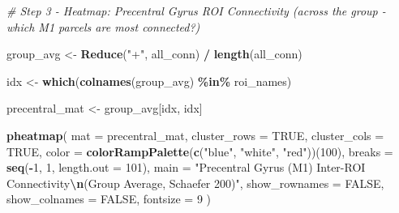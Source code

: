\documentclass[
]{article}
\newenvironment{Shaded}{\begin{snugshade}}{\end{snugshade}}
\newcommand{\AttributeTok}[1]{\textcolor[rgb]{0.13,0.29,0.53}{#1}}
\newcommand{\CommentTok}[1]{\textcolor[rgb]{0.56,0.35,0.01}{\textit{#1}}}
\newcommand{\ConstantTok}[1]{\textcolor[rgb]{0.56,0.35,0.01}{#1}}
\newcommand{\DecValTok}[1]{\textcolor[rgb]{0.00,0.00,0.81}{#1}}
\newcommand{\FunctionTok}[1]{\textcolor[rgb]{0.13,0.29,0.53}{\textbf{#1}}}
\newcommand{\NormalTok}[1]{#1}
\newcommand{\OtherTok}[1]{\textcolor[rgb]{0.56,0.35,0.01}{#1}}
\newcommand{\SpecialCharTok}[1]{\textcolor[rgb]{0.81,0.36,0.00}{\textbf{#1}}}
\newcommand{\StringTok}[1]{\textcolor[rgb]{0.31,0.60,0.02}{#1}}
\begin{document}
\begin{Shaded}
\begin{Highlighting}[]
\CommentTok{\# Step 3 {-} Heatmap: Precentral Gyrus ROI Connectivity (across the group {-} which M1 parcels are most connected?)}

\NormalTok{group\_avg }\OtherTok{\textless{}{-}} \FunctionTok{Reduce}\NormalTok{(}\StringTok{"+"}\NormalTok{, all\_conn) }\SpecialCharTok{/} \FunctionTok{length}\NormalTok{(all\_conn)}

\NormalTok{idx }\OtherTok{\textless{}{-}} \FunctionTok{which}\NormalTok{(}\FunctionTok{colnames}\NormalTok{(group\_avg) }\SpecialCharTok{\%in\%}\NormalTok{ roi\_names)}

\NormalTok{precentral\_mat }\OtherTok{\textless{}{-}}\NormalTok{ group\_avg[idx, idx]}

\FunctionTok{pheatmap}\NormalTok{(}
  \AttributeTok{mat           =}\NormalTok{ precentral\_mat,}
  \AttributeTok{cluster\_rows  =} \ConstantTok{TRUE}\NormalTok{,}
  \AttributeTok{cluster\_cols  =} \ConstantTok{TRUE}\NormalTok{,}
  \AttributeTok{color         =} \FunctionTok{colorRampPalette}\NormalTok{(}\FunctionTok{c}\NormalTok{(}\StringTok{"blue"}\NormalTok{, }\StringTok{"white"}\NormalTok{, }\StringTok{"red"}\NormalTok{))(}\DecValTok{100}\NormalTok{),}
  \AttributeTok{breaks        =} \FunctionTok{seq}\NormalTok{(}\SpecialCharTok{{-}}\DecValTok{1}\NormalTok{, }\DecValTok{1}\NormalTok{, }\AttributeTok{length.out =} \DecValTok{101}\NormalTok{),}
  \AttributeTok{main          =} \StringTok{"Precentral Gyrus (M1) Inter{-}ROI Connectivity}\SpecialCharTok{\textbackslash{}n}\StringTok{(Group Average, Schaefer 200)"}\NormalTok{,}
  \AttributeTok{show\_rownames =} \ConstantTok{FALSE}\NormalTok{,}
  \AttributeTok{show\_colnames =} \ConstantTok{FALSE}\NormalTok{,}
  \AttributeTok{fontsize      =} \DecValTok{9}
\NormalTok{)}
\end{Highlighting}
\end{Shaded}
\end{document}
